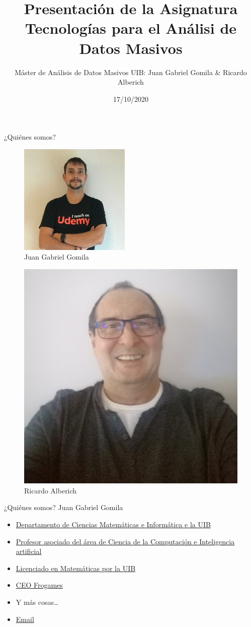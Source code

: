 \documentclass[
  ignorenonframetext,
]{beamer}
\title{Presentación de la Asignatura Tecnologías para el Análisi de
Datos Masivos}
\author{Máster de Análisis de Datos Masivos UIB: Juan Gabriel Gomila \&
Ricardo Alberich}
\date{17/10/2020}
\providecommand{\tightlist}{%
  \setlength{\itemsep}{0pt}\setlength{\parskip}{0pt}}
\begin{document}
\frame{\titlepage}

\begin{frame}{¿Quiénes somos?}
\protect\hypertarget{quiuxe9nes-somos}{}
\begin{figure}
\includegraphics[width=0.25\linewidth]{joanby} \caption{Juan Gabriel Gomila}\label{fig:foto_jb}
\end{figure}

\begin{figure}
\includegraphics[width=0.25\linewidth]{ra_2020_2} \caption{Ricardo Alberich}\label{fig:foto_ra}
\end{figure}
\end{frame}

\begin{frame}{¿Quiénes somos? Juan Gabriel Gomila}
\protect\hypertarget{quiuxe9nes-somos-juan-gabriel-gomila}{}
\begin{itemize}
\tightlist
\item
  \href{https://www.uib.es/es/lauib/Govern-i-organitzacio/estructura/Departaments/dmi/}{Departamento
  de Ciencias Matemáticas e Informática e la UIB}
\item
  \href{https://www.uib.eu/personal/ABjE5ODE5MA/}{Profesor asociado del
  área de Ciencia de la Computación e Inteligencia artificial}
\item
  \href{https://www.uib.es/es/}{Licenciado en Matemáticas por la UIB}
\item
  \href{https://frogames.es/}{CEO Frogames}
\item
  Y más cosas\ldots{}
\item
  \href{mailto:juan.gabriel.gomila@uib.es}{Email}
\end{itemize}
\end{frame}
\end{document}
